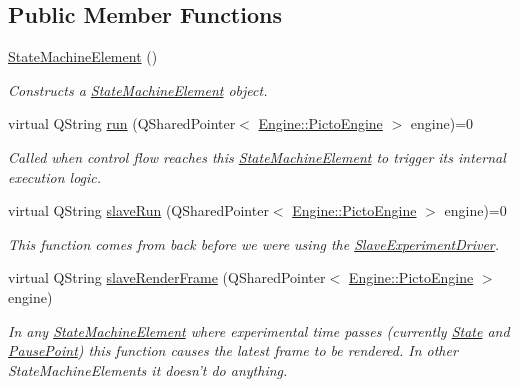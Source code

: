 \subsection*{Public Member Functions}
\begin{DoxyCompactItemize}
\item 
\hyperlink{class_picto_1_1_state_machine_element_af2bac57936cd727c5dcb46c23052414a}{State\-Machine\-Element} ()
\begin{DoxyCompactList}\small\item\em Constructs a \hyperlink{class_picto_1_1_state_machine_element}{State\-Machine\-Element} object. \end{DoxyCompactList}\item 
virtual Q\-String \hyperlink{class_picto_1_1_state_machine_element_a7a1f1ca8905c111dd043178b9132c770}{run} (Q\-Shared\-Pointer$<$ \hyperlink{class_picto_1_1_engine_1_1_picto_engine}{Engine\-::\-Picto\-Engine} $>$ engine)=0
\begin{DoxyCompactList}\small\item\em Called when control flow reaches this \hyperlink{class_picto_1_1_state_machine_element}{State\-Machine\-Element} to trigger its internal execution logic. \end{DoxyCompactList}\item 
virtual Q\-String \hyperlink{class_picto_1_1_state_machine_element_a0dbfefa77a60c323a285626bf6057c2b}{slave\-Run} (Q\-Shared\-Pointer$<$ \hyperlink{class_picto_1_1_engine_1_1_picto_engine}{Engine\-::\-Picto\-Engine} $>$ engine)=0
\begin{DoxyCompactList}\small\item\em This function comes from back before we were using the \hyperlink{class_picto_1_1_slave_experiment_driver}{Slave\-Experiment\-Driver}. \end{DoxyCompactList}\item 
virtual Q\-String \hyperlink{class_picto_1_1_state_machine_element_ab993f13815701b3dc47a7f50985d29bf}{slave\-Render\-Frame} (Q\-Shared\-Pointer$<$ \hyperlink{class_picto_1_1_engine_1_1_picto_engine}{Engine\-::\-Picto\-Engine} $>$ engine)
\begin{DoxyCompactList}\small\item\em In any \hyperlink{class_picto_1_1_state_machine_element}{State\-Machine\-Element} where experimental time passes (currently \hyperlink{class_picto_1_1_state}{State} and \hyperlink{class_picto_1_1_pause_point}{Pause\-Point}) this function causes the latest frame to be rendered. In other State\-Machine\-Elements it doesn't do anything. \end{DoxyCompactList}\item 

\end{DoxyCompactItemize}
